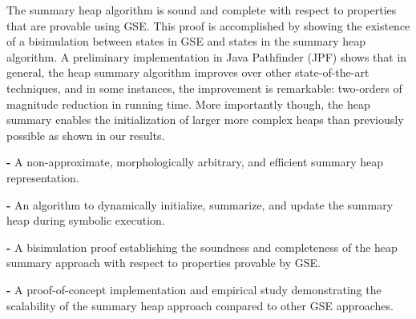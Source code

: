 The summary heap algorithm is sound and complete with respect to
properties that are provable using GSE. This proof is accomplished by
showing the existence of a bisimulation between states in GSE and
states in the summary heap algorithm.  A preliminary implementation in
Java Pathfinder (JPF) shows that in general, the heap summary
algorithm improves over other state-of-the-art techniques, and in some
instances, the improvement is remarkable: two-orders of magnitude
reduction in running time. More importantly though, the heap summary
enables the initialization of larger more complex heaps than
previously possible as shown in our results.

\begin{compactdesc}

\item\textbf{-} A non-approximate, morphologically arbitrary, and efficient 
summary heap representation.

\item\textbf{-} An algorithm to dynamically initialize, summarize, and
  update the summary heap during symbolic execution.

\item\textbf{-} A bisimulation proof establishing the soundness and 
completeness of the heap summary approach with respect to
properties provable by GSE.

\item\textbf{-} A proof-of-concept implementation and empirical study 
demonstrating the scalability of the summary heap approach
compared to other GSE approaches.

\end{compactdesc}
